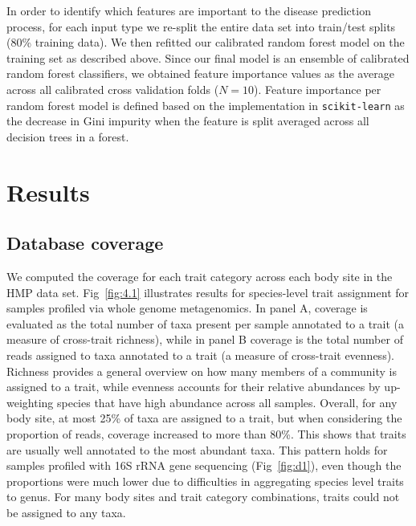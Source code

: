 In order to identify which features are important to the disease prediction process, for each input type we re-split the entire data set into train/test splits (80\% training data). We then refitted our calibrated random forest model on the training set as described above. Since our final model is an ensemble of calibrated random forest classifiers, we obtained feature importance values as the average across all calibrated cross validation folds ($N = 10$). Feature importance per random forest model is defined based on the implementation in \texttt{scikit-learn} as the decrease in Gini impurity when the feature is split averaged across all decision trees in a forest. 

\section{Results}

\subsection{Database coverage}

We computed the coverage for each trait category across each body site in the HMP data set. Fig~\ref{fig:4.1} illustrates results for species-level trait assignment for samples profiled via whole genome metagenomics. In panel A, coverage is evaluated as the total number of taxa present per sample annotated to a trait (a measure of cross-trait richness), while in panel B coverage is the total number of reads assigned to taxa annotated to a trait (a measure of cross-trait evenness). Richness provides a general overview on how many members of a community is assigned to a trait, while evenness accounts for their relative abundances by up-weighting species that have high abundance across all samples. Overall, for any body site, at most 25\% of taxa are assigned to a trait, but when considering the proportion of reads, coverage increased to more than 80\%. This shows that traits are usually well annotated to the most abundant taxa.  This pattern holds for samples profiled with 16S rRNA gene sequencing (Fig~\ref{fig:d1}), even though the proportions were much lower due to difficulties in aggregating species level traits to genus. For many body sites and trait category combinations, traits could not be assigned to any taxa. 

